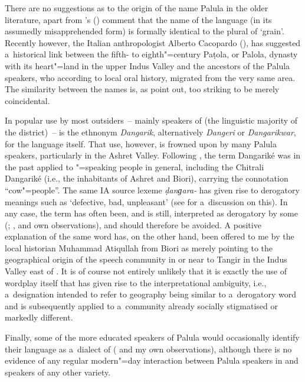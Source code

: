 \largerpage
There are no suggestions as to the origin of the name Palula in the older literature, apart from \citeauthor{morgenstierne1941}'s (\citeyear[53]{morgenstierne1941}) comment that the name of the language (in its assumedly misapprehended form) is formally identical to the plural of `grain'. Recently however, the Italian anthropologist Alberto Cacopardo (\citeyear[91]{cacopardo2001}), has suggested a~historical link between the fifth- to eighth"=century Paṭola, or Palola, dynasty with its heart"=land in the upper Indus Valley and the ancestors of the Palula speakers, who according to local oral history, migrated from the very same area. The similarity between the names is, as \citet[3]{schmidtkohistani2008} point out, too striking to be merely coincidental.


In popular use by most outsiders~-- mainly speakers of \iliKhowar (the linguistic majority of the district)~-- is the ethnonym \textit{Dangarik},
alternatively \textit{Dangeri} or \textit{Dangarikwar}, for the language itself. That use, however,
is frowned upon by many Palula speakers, particularly in the Ashret Valley. Following
\citet[113]{biddulph1986}, the term Dangariké was in the past applied to \iliShina"=speaking people in general, including the Chitrali Dangariké (i.e., the inhabitants of Ashret and Biori), carrying the
connotation ``cow"=people''. The same IA source lexeme \textit{ḍanɡara-}
\citep[5526, 5524]{turner1966} has given rise to derogatory meanings such as `defective, bad,
unpleasant' (see \citealt[81]{cacopardo2001} for a~discussion on this). In any case, the term has
often been, and is still, interpreted as derogatory by some (\citealt[69]{decker1992a};
\citeyear[160]{decker1996}, and own observations), and should therefore be avoided. A positive
explanation of the same word has, on the other hand, been offered to me by the local historian Muhammad Atiqullah from Biori as merely pointing to the geographical origin of the speech community in or near to
Tangir in the Indus Valley east of \iliChitral. It is of course not entirely unlikely that it is exactly
the use of wordplay itself that has given rise to the interpretational ambiguity, i.e., a~designation
intended to refer to geography being similar to a~derogatory word and is subsequently applied to
a~community already socially stigmatised or markedly different.


Finally, some of the more educated speakers of Palula would occasionally identify their language as a~dialect of \iliShina (\citealt[82]{decker1992a} and my own observations), although there is no evidence of any regular modern"=day interaction between Palula speakers in \iliChitral and speakers of any other \iliShina variety. 

